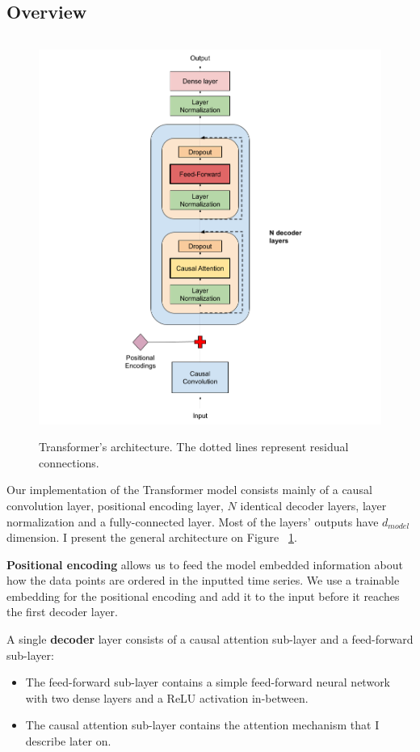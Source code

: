\documentclass[en]{pracamgr}
\begin{document}
	\subsection{Overview}
	
	\begin{figure}[ht!]
		\centering
		\includegraphics[height=130mm]{decoder3.png}
		\caption{Transformer's architecture. The dotted lines represent residual connections. \label{our-decoder}}
	\end{figure}
	
	
	
	Our implementation of the Transformer model consists mainly of a causal convolution layer, positional encoding layer, $N$ identical decoder layers, layer normalization and a fully-connected layer. 
	Most of the layers' outputs have $d_{model}$ dimension.
	I present the general architecture on Figure ~\ref{our-decoder}.
	
	\textbf{Positional encoding} allows us to feed the model embedded information about how the data points are ordered in the inputted time series.
	We use a trainable embedding for the positional encoding and add it to the input before it reaches the first decoder layer.
	
	A single \textbf{decoder} layer consists of a causal attention sub-layer and a feed-forward sub-layer:
	\begin{itemize}
		\item The feed-forward sub-layer contains a simple feed-forward neural network with two dense layers and a ReLU activation in-between.
		\item The causal attention sub-layer contains the attention mechanism that I describe later on.
	\end{itemize}
	
\end{document}
